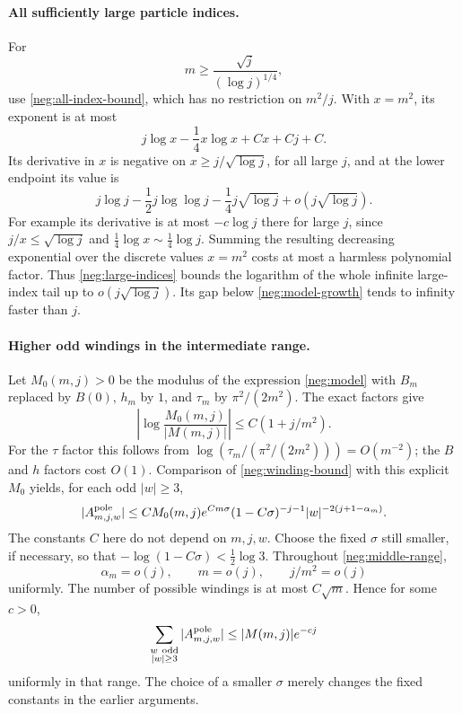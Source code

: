 \documentclass[11pt]{article}
\numberwithin{equation}{section}
\theoremstyle{definition}
\begin{document}
\paragraph{All sufficiently large particle indices.}
For
\[
 m\ge\frac{\sqrt j}{(\log j)^{1/4}},
 \]
use \eqref{neg:all-index-bound}, which has no restriction
on \(m^2/j\).  With \(x=m^2\), its exponent is at most
\[
 j\log x-\frac14x\log x+Cx+Cj+C .
 \]
Its derivative in \(x\) is negative on
\(x\ge j/\sqrt{\log j}\), for all large \(j\), and at the
lower endpoint its value is
\begin{equation}
 j\log j-\frac12j\log\log j
            -\frac14j\sqrt{\log j}
            +o(j\sqrt{\log j}).
 \label{neg:large-indices}
\end{equation}
For example its derivative is at most \(-c\log j\)
there for large \(j\), since
\(j/x\le\sqrt{\log j}\) and
\(\tfrac14\log x\sim\tfrac14\log j\).
Summing the resulting decreasing exponential over the
discrete values \(x=m^2\) costs at most a harmless polynomial
factor.  Thus \eqref{neg:large-indices} bounds the logarithm
of the whole infinite large-index tail up to
\(o(j\sqrt{\log j})\).
Its gap below \eqref{neg:model-growth} tends to infinity
faster than \(j\).

\paragraph{Higher odd windings in the intermediate range.}
Let \(M_0(m,j)>0\) be the modulus of the expression
\eqref{neg:model} with \(B_m\) replaced by \(B(0)\),
\(h_m\) by \(1\), and \(\tau_m\) by
\(\pi^2/(2m^2)\).  The exact factors give
\begin{equation}
 \left|\log\frac{M_0(m,j)}{|M(m,j)|}\right|
 \le C(1+j/m^2).
 \label{neg:M0}
\end{equation}
For the \(\tau\) factor this follows from
\(\log(\tau_m/(\pi^2/(2m^2)))=O(m^{-2})\);
the \(B\) and \(h\) factors cost \(O(1)\).
Comparison of \eqref{neg:winding-bound} with this
explicit \(M_0\) yields, for each odd \(|w|\ge3\),
\[
 |A^{\rm pole}_{m,j,w}|
 \le C M_0(m,j)e^{Cm\sigma}
       (1-C\sigma)^{-j-1}
       |w|^{-2(j+1-\alpha_m)} .
 \]
The constants \(C\) here do not depend on \(m,j,w\).
Choose the fixed \(\sigma\) still smaller, if necessary,
so that
\(-\log(1-C\sigma)<\tfrac12\log3\).
Throughout \eqref{neg:middle-range},
\[
 \alpha_m=o(j),\qquad m=o(j),\qquad j/m^2=o(j)
 \]
uniformly.  The number of possible windings is at most
\(C\sqrt m\).  Hence for some \(c>0\),
\begin{equation}
 \sum_{\substack{w\ {\rm odd}\\|w|\ge3}}
       |A^{\rm pole}_{m,j,w}|
 \le |M(m,j)|e^{-cj}
 \label{neg:higher-windings}
\end{equation}
uniformly in that range.  The choice of a smaller
\(\sigma\) merely changes the fixed constants in the
earlier arguments.
\end{document}
